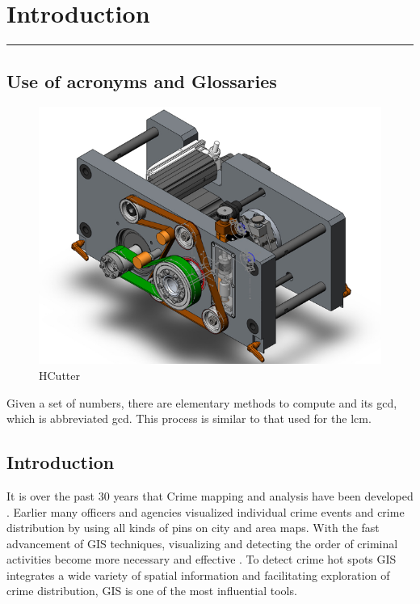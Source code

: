 \chapter{Introduction}\hrule
\label{Chapter:1}

\section{Use of acronyms and Glossaries}

\begin{figure}
\centering
\includegraphics[width=0.7\linewidth]{./images/HCutter640}
\caption{HCutter}
\label{fig:HCutter640}
\end{figure}

Given a set of numbers, there are elementary methods to compute \cite{Ansar2003} and \cite{Backus1977}
its \acrlong{gcd}, which is abbreviated \acrshort{gcd}. This 
process is similar to that used for the \acrfull{lcm}.
\section{Introduction}
It is over the past 30 years that Crime mapping and analysis have been developed \citep{Ansar2003}. Earlier many officers and agencies visualized individual crime events and crime distribution by using all kinds of pins on city and area maps. With the fast advancement of GIS techniques, visualizing and detecting the order of criminal activities become more necessary and effective \citep{Shannon1949}. To detect crime hot spots GIS integrates a wide variety of spatial information and facilitating exploration of crime distribution, GIS is one of the most influential tools.

